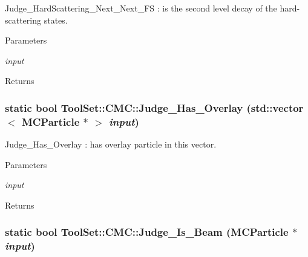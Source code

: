 Judge\_\-HardScattering\_\-Next\_\-Next\_\-FS : is the second level decay of the hard-\/scattering states. 
\begin{DoxyParams}{Parameters}
\item[{\em input}]\end{DoxyParams}
\begin{DoxyReturn}{Returns}

\end{DoxyReturn}
\hypertarget{classToolSet_1_1CMC_a257af2810ec961f3e1a71f29bc12154f}{
\subsubsection[{Judge\_\-Has\_\-Overlay}]{\setlength{\rightskip}{0pt plus 5cm}static bool ToolSet::CMC::Judge\_\-Has\_\-Overlay (std::vector$<$ MCParticle $\ast$ $>$ {\em input})}}
\label{classToolSet_1_1CMC_a257af2810ec961f3e1a71f29bc12154f}


Judge\_\-Has\_\-Overlay : has overlay particle in this vector. 
\begin{DoxyParams}{Parameters}
\item[{\em input}]\end{DoxyParams}
\begin{DoxyReturn}{Returns}

\end{DoxyReturn}
\hypertarget{classToolSet_1_1CMC_aa63f12865d46af350674c7dca3eb5437}{
\subsubsection[{Judge\_\-Is\_\-Beam}]{\setlength{\rightskip}{0pt plus 5cm}static bool ToolSet::CMC::Judge\_\-Is\_\-Beam (MCParticle $\ast$ {\em input})}}
\label{classToolSet_1_1CMC_aa63f12865d46af350674c7dca3eb5437}


